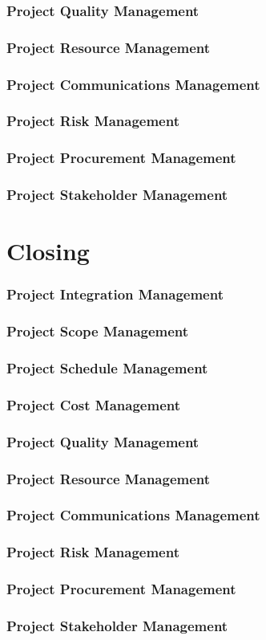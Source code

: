 \documentclass[12pt,letterpaper]{report}
\begin{document}
	\section{Project Quality Management}
	\section{Project Resource Management}
	\section{Project Communications Management}
	\section{Project Risk Management}
	\section{Project Procurement Management}
	\section{Project Stakeholder Management}
	
	
	\part{Closing}
	\section{Project Integration Management}
	\section{Project Scope Management}
	\section{Project Schedule Management}
	\section{Project Cost Management}
	\section{Project Quality Management}
	\section{Project Resource Management}
	\section{Project Communications Management}
	\section{Project Risk Management}
	\section{Project Procurement Management}
	\section{Project Stakeholder Management}
	
\end{document}
